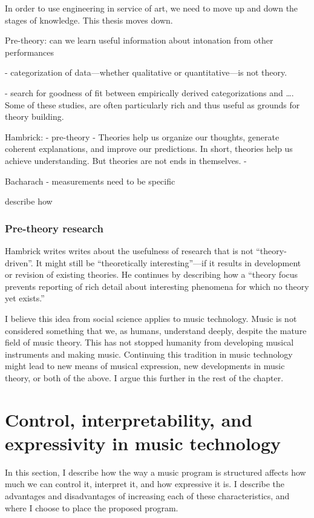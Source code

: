 In order to use engineering in service of art, we need to move up and down the stages of knowledge. This thesis moves down. 

Pre-theory: can we learn useful information about intonation from other performances

- categorization of data—whether qualitative or quantitative—is not theory. 

- search for goodness of fit between empirically derived categorizations and …. Some of these studies, are often particularly rich and thus useful as grounds for theory building. 

Hambrick: - pre-theory
- Theories help us organize our thoughts, generate coherent explanations, and improve our predictions. In short, theories help us achieve understanding. But theories are not ends in themselves.
- 

Bacharach - measurements need to be specific

describe how 

\subsubsection{Pre-theory research}
\label{sec:pretheory}
Hambrick writes writes about the usefulness of research that is not ``theory-driven''. It might still be ``theoretically interesting''---if it results in development or revision of existing theories. He continues by describing how a ``theory focus prevents reporting of rich detail about interesting phenomena for which no theory yet exists.'' 

I believe this idea from social science applies to music technology. Music is not considered something that we, as humans, understand deeply, despite the mature field of music theory. This has not stopped humanity from developing musical instruments and making music. Continuing this tradition in music technology might lead to new means of musical expression, new developments in music theory, or both of the above. I argue this further in the rest of the chapter.

\section{Control, interpretability, and expressivity in music technology}
In this section, I describe how the way a music program is structured affects how much we can control it, interpret it, and how expressive it is. I describe the advantages and disadvantages of increasing each of these characteristics, and where I choose to place the proposed program. 

